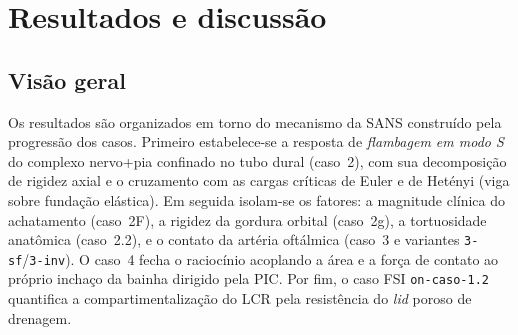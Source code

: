 %
%
%

\section*{Resultados e discussão}
\label{sec:resultados}

\subsection*{Visão geral}
\label{sec:res-overview}

Os resultados são organizados em torno do mecanismo da SANS construído pela progressão dos casos. Primeiro estabelece-se a resposta de \emph{flambagem em modo S} do complexo nervo+pia confinado no tubo dural (caso~2), com sua decomposição de rigidez axial e o cruzamento com as cargas críticas de Euler e de Hetényi (viga sobre fundação elástica). Em seguida isolam-se os fatores: a magnitude clínica do achatamento (caso~2F), a rigidez da gordura orbital (caso~2g), a tortuosidade anatômica (caso~2.2), e o contato da artéria oftálmica (caso~3 e variantes \texttt{3-sf}/\texttt{3-inv}). O caso~4 fecha o raciocínio acoplando a área e a força de contato ao próprio inchaço da bainha dirigido pela PIC. Por fim, o caso FSI \texttt{on-caso-1.2} quantifica a compartimentalização do LCR pela resistência do \emph{lid} poroso de drenagem.

